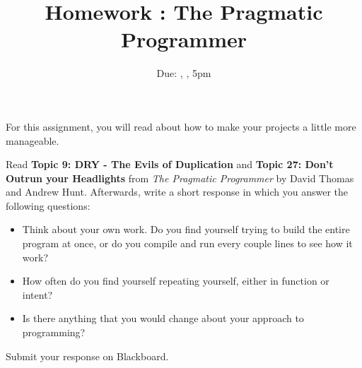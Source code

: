 \documentclass[12pt]{article}
\title{Homework \hwno: The Pragmatic Programmer}
\date{Due: \dayofweekname{\duedate}{\duemonth}{\year}, \monthname[\duemonth] \duedate, 5pm}
\begin{document}
\maketitle

For this assignment, you will read about how to make your projects a little more manageable.

Read \textbf{Topic 9: DRY - The Evils of Duplication} and \textbf{Topic 27: Don't Outrun your Headlights} from \emph{The Pragmatic Programmer} by David Thomas and Andrew Hunt.
Afterwards, write a short response in which you answer the following questions:

\begin{itemize}
	\item Think about your own work.  Do you find yourself trying to build the entire program at once, or do you compile and run every couple lines to see how it work?
	\item How often do you find yourself repeating yourself, either in function or intent?
	\item Is there anything that you would change about your approach to programming?
\end{itemize}

Submit your response on Blackboard.
\end{document}
